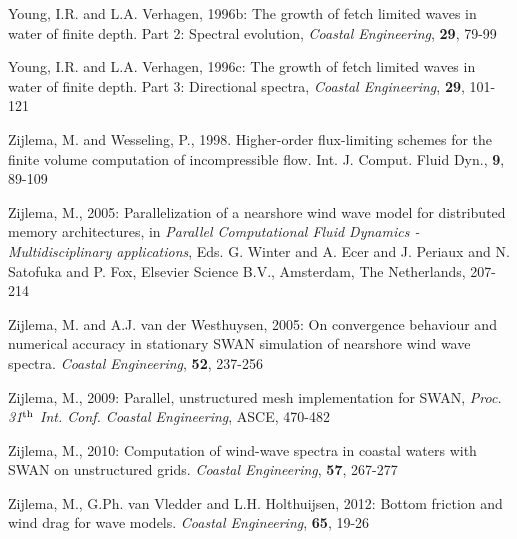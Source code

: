 \documentclass[12pt]{book}
\begin{document}
\begin{thebibliography}{10}
Young, I.R. and L.A. Verhagen, 1996b: The growth of fetch limited waves in water of finite depth. Part 2:
Spectral evolution, {\it Coastal Engineering}, {\bf 29}, 79-99

Young, I.R. and L.A. Verhagen, 1996c: The growth of fetch limited waves in water of finite depth. Part 3:
Directional spectra, {\it Coastal Engineering}, {\bf 29}, 101-121

Zijlema, M. and Wesseling, P., 1998. Higher-order flux-limiting schemes for the finite volume
  computation of incompressible flow. Int. J. Comput. Fluid Dyn., {\bf 9}, 89-109

Zijlema, M., 2005: Parallelization of a nearshore wind wave model for distributed memory architectures,
in {\it Parallel Computational Fluid Dynamics - {M}ultidisciplinary applications},
Eds. G. Winter and A. Ecer and J. Periaux and N. Satofuka and P. Fox,
Elsevier Science B.V., Amsterdam, The Netherlands, 207-214

Zijlema, M. and A.J. van der Westhuysen, 2005: On convergence behaviour and numerical accuracy in stationary
SWAN simulation of nearshore wind wave spectra. {\it Coastal Engineering}, {\bf 52}, 237-256

Zijlema, M., 2009: Parallel, unstructured mesh implementation for SWAN,
{\it Proc. 31$^{{\rm th}}$ Int. Conf. Coastal Engineering}, ASCE, 470-482

Zijlema, M., 2010: Computation of wind-wave spectra in coastal waters with SWAN on unstructured grids.
{\it Coastal Engineering}, {\bf 57}, 267-277

Zijlema, M., G.Ph. van Vledder and L.H. Holthuijsen, 2012: Bottom friction and wind drag for wave models.
{\it Coastal Engineering}, {\bf 65}, 19-26

\end{thebibliography}
\end{document}
